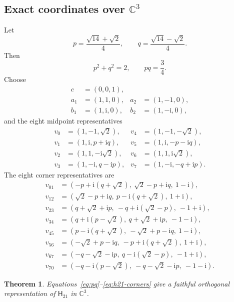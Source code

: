 \documentclass[twocolumn,aps,pra,floatfix,amsmath,amssymb,longbibliography]{revtex4-2}
\newtheorem{theorem}{Theorem}
\theoremstyle{definition}
\theoremstyle{remark}
\newcommand{\ii}{\mathrm{i}}
\newcommand{\C}{\mathbb C}
\newcommand{\Htwentyone}{\mathsf H_{21}}
\begin{document}
\subsection{Exact coordinates over \texorpdfstring{$\C^3$}{C3}}

Let
\begin{equation}
 p=\frac{\sqrt{14}+\sqrt2}{4},\qquad
 q=\frac{\sqrt{14}-\sqrt2}{4}.
 \label{eq:pq}
\end{equation}
Then
\begin{equation}
 p^2+q^2=2,\qquad pq=\frac34.
 \label{eq:pq-identities}
\end{equation}
Choose
\begin{align}
 c&=(0,0,1),\nonumber\\
 a_1&=(1,1,0),&a_2&=(1,-1,0),\nonumber\\
 b_1&=(1,\ii,0),&b_2&=(1,-\ii,0),
 \label{eq:h21-inner}
\end{align}
and the eight midpoint representatives
\begin{align}
 v_0&=(1,-1,\sqrt2),&v_4&=(1,-1,-\sqrt2),\nonumber\\
 v_1&=(1,\ii,p+\ii q),&v_5&=(1,\ii,-p-\ii q),\nonumber\\
 v_2&=(1,1,-\ii\sqrt2),&v_6&=(1,1,\ii\sqrt2),\nonumber\\
 v_3&=(1,-\ii,q-\ii p),&v_7&=(1,-\ii,-q+\ii p).
 \label{eq:h21-midpoints}
\end{align}
The eight corner representatives are
\begin{align}
 v_{01}&=(-p+\ii(q+\sqrt2),\ \sqrt2-p+\ii q,\ 1-\ii),\nonumber\\
 v_{12}&=(\sqrt2-p+\ii q,\ p-\ii(q+\sqrt2),\ 1+\ii),\nonumber\\
 v_{23}&=(q+\sqrt2+\ii p,\ -q+\ii(\sqrt2-p),\ -1+\ii),\nonumber\\
 v_{34}&=(q+\ii(p-\sqrt2),\ q+\sqrt2+\ii p,\ -1-\ii),\nonumber\\
 v_{45}&=(p-\ii(q+\sqrt2),\ -\sqrt2+p-\ii q,\ 1-\ii),\nonumber\\
 v_{56}&=(-\sqrt2+p-\ii q,\ -p+\ii(q+\sqrt2),\ 1+\ii),\nonumber\\
 v_{67}&=(-q-\sqrt2-\ii p,\ q-\ii(\sqrt2-p),\ -1+\ii),\nonumber\\
 v_{70}&=(-q-\ii(p-\sqrt2),\ -q-\sqrt2-\ii p,\ -1-\ii).
 \label{eq:h21-corners}
\end{align}

\begin{theorem}
\label{thm:h21-complex}
Equations~\eqref{eq:pq}--\eqref{eq:h21-corners} give a faithful
orthogonal representation of $\Htwentyone$ in $\C^3$.
\end{theorem}
\end{document}
